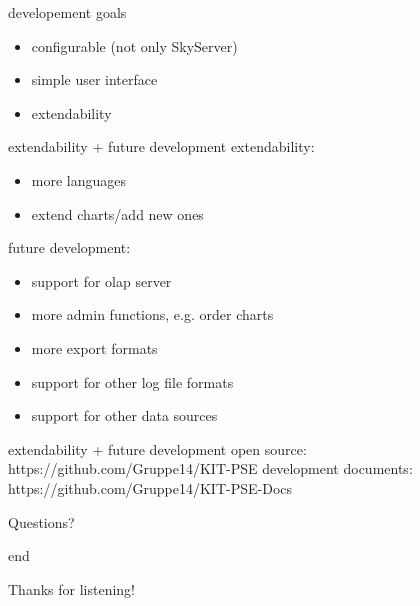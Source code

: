 \documentclass[xcolor=dvipsnames]{beamer}
\begin{document}
\begin{frame}{developement goals}
	\begin{itemize}
	  \item<1-> configurable (not only SkyServer)
	  \item<2-> simple user interface
	  \item<3-> extendability
	\end{itemize}
\end{frame}

\begin{frame}{extendability + future development}
	extendability:
	\begin{itemize}
	  \item<2-> more languages
	  \item<3-> extend charts/add new ones
	\end{itemize}
	 {future development:}
	\begin{itemize}
	  \item<5-> support for olap server
	  \item<6-> more admin functions, e.g. order charts
	  \item<7-> more export formats
	  \item<8-> support for other log file formats
	  \item<9-> support for other data sources
	\end{itemize}
\end{frame}

\begin{frame}{extendability + future development}
	open source: https://github.com/Gruppe14/KIT-PSE
	\newline development documents: https://github.com/Gruppe14/KIT-PSE-Docs
\end{frame}

\begin{frame}{}
	\begin{center}
	\huge{Questions?}
	\end{center}
\end{frame}  

\begin{frame}{end}

\begin{center}
\huge{Thanks for listening!}
\end{center}


\end{frame}  


\end{document}
